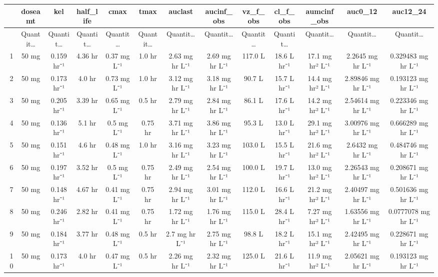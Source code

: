 \documentclass[12pt,a4paper]{article}
\begin{document}
\begin{tabular}{r|cccccccccccc}
	& doseamt & kel & half\_life & cmax & tmax & auclast & aucinf\_obs & vz\_f\_obs & cl\_f\_obs & aumcinf\_obs & auc0\_12 & auc12\_24\\
	\hline
	& Quantit… & Quantit… & Quantit… & Quantit… & Quantit… & Quantit… & Quantit… & Quantit… & Quantit… & Quantit… & Quantit… & Quantit…\\
	\hline
	1 & 50 mg & 0.159 hr⁻¹ & 4.36 hr & 0.37 mg L⁻¹ & 1.0 hr & 2.63 mg hr L⁻¹ & 2.69 mg hr L⁻¹ & 117.0 L & 18.6 L hr⁻¹ & 17.1 mg hr² L⁻¹ & 2.2645 mg hr L⁻¹ & 0.329483 mg hr L⁻¹ \\
	2 & 50 mg & 0.173 hr⁻¹ & 4.0 hr & 0.73 mg L⁻¹ & 1.0 hr & 3.12 mg hr L⁻¹ & 3.18 mg hr L⁻¹ & 90.7 L & 15.7 L hr⁻¹ & 14.4 mg hr² L⁻¹ & 2.89846 mg hr L⁻¹ & 0.193123 mg hr L⁻¹ \\
	3 & 50 mg & 0.205 hr⁻¹ & 3.39 hr & 0.65 mg L⁻¹ & 0.5 hr & 2.79 mg hr L⁻¹ & 2.84 mg hr L⁻¹ & 86.1 L & 17.6 L hr⁻¹ & 14.2 mg hr² L⁻¹ & 2.54614 mg hr L⁻¹ & 0.223346 mg hr L⁻¹ \\
	4 & 50 mg & 0.136 hr⁻¹ & 5.1 hr & 0.5 mg L⁻¹ & 0.75 hr & 3.71 mg hr L⁻¹ & 3.86 mg hr L⁻¹ & 95.3 L & 13.0 L hr⁻¹ & 29.1 mg hr² L⁻¹ & 3.00976 mg hr L⁻¹ & 0.666289 mg hr L⁻¹ \\
	5 & 50 mg & 0.151 hr⁻¹ & 4.6 hr & 0.48 mg L⁻¹ & 1.0 hr & 3.16 mg hr L⁻¹ & 3.23 mg hr L⁻¹ & 103.0 L & 15.5 L hr⁻¹ & 21.6 mg hr² L⁻¹ & 2.6432 mg hr L⁻¹ & 0.484746 mg hr L⁻¹ \\
	6 & 50 mg & 0.197 hr⁻¹ & 3.52 hr & 0.5 mg L⁻¹ & 0.75 hr & 2.49 mg hr L⁻¹ & 2.54 mg hr L⁻¹ & 100.0 L & 19.7 L hr⁻¹ & 13.0 mg hr² L⁻¹ & 2.26543 mg hr L⁻¹ & 0.208671 mg hr L⁻¹ \\
	7 & 50 mg & 0.148 hr⁻¹ & 4.67 hr & 0.41 mg L⁻¹ & 0.75 hr & 2.94 mg hr L⁻¹ & 3.01 mg hr L⁻¹ & 112.0 L & 16.6 L hr⁻¹ & 21.2 mg hr² L⁻¹ & 2.40497 mg hr L⁻¹ & 0.501636 mg hr L⁻¹ \\
	8 & 50 mg & 0.246 hr⁻¹ & 2.82 hr & 0.41 mg L⁻¹ & 0.75 hr & 1.72 mg hr L⁻¹ & 1.76 mg hr L⁻¹ & 115.0 L & 28.4 L hr⁻¹ & 7.27 mg hr² L⁻¹ & 1.63556 mg hr L⁻¹ & 0.0777078 mg hr L⁻¹ \\
	9 & 50 mg & 0.184 hr⁻¹ & 3.77 hr & 0.48 mg L⁻¹ & 0.5 hr & 2.7 mg hr L⁻¹ & 2.75 mg hr L⁻¹ & 98.8 L & 18.2 L hr⁻¹ & 15.1 mg hr² L⁻¹ & 2.42495 mg hr L⁻¹ & 0.228671 mg hr L⁻¹ \\
	10 & 50 mg & 0.173 hr⁻¹ & 4.0 hr & 0.47 mg L⁻¹ & 0.5 hr & 2.26 mg hr L⁻¹ & 2.32 mg hr L⁻¹ & 125.0 L & 21.6 L hr⁻¹ & 11.9 mg hr² L⁻¹ & 2.05621 mg hr L⁻¹ & 0.193123 mg hr L⁻¹ \\

\end{tabular}
\end{document}
